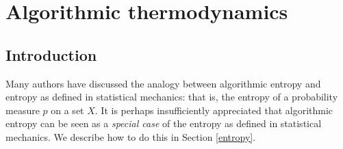 \documentclass[12pt,twoside,openright]{report}
\begin{document}
\chapter{Algorithmic thermodynamics}



\section{Introduction}\label{intro}

Many authors \cite{BGLVZ, Chaitin1975, FT1982, Kolmogorov1965, LevinZvonkin, Solomonoff1964, Szilard1929, Tadaki2008} have discussed the analogy between algorithmic entropy and entropy as defined in statistical mechanics: that is, the entropy of a probability measure 
$p$ on a set $X$.  It is perhaps insufficiently appreciated that algorithmic entropy can be seen as a \textit{special case} of the entropy as defined in statistical mechanics.  We describe how to do this in Section \ref{entropy}.
\end{document}
